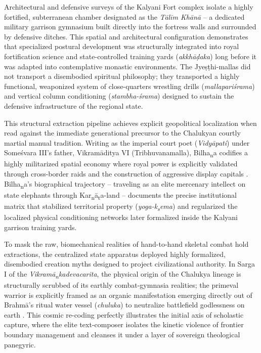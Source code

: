 \documentclass[11pt,twoside,letterpaper]{article}
\begin{document}
Architectural and defensive surveys of the Kalyani Fort complex isolate a highly fortified, subterranean chamber designated as the \textit{Tālīm Khānā} -- a dedicated military garrison gymnasium built directly into the fortress walls and surrounded by defensive ditches. This spatial and architectural configuration demonstrates that specialized postural development was structurally integrated into royal fortification science and state-controlled training yards (\textit{akkhāḍaka}) long before it was adapted into contemplative monastic environments. The Jyeṣṭhi-mallas did not transport a disembodied spiritual philosophy; they transported a highly functional, weaponized system of close-quarters wrestling drills (\textit{mallapariśrama}) and vertical column conditioning (\textit{stambha-śrama}) designed to sustain the defensive infrastructure of the regional state.

This structural extraction pipeline achieves explicit geopolitical localization when read against the immediate generational precursor to the Chalukyan courtly martial manual tradition. Writing as the imperial court poet (\textit{Vidy\={a}pati}) under Some\'svara III's father, Vikram\={a}ditya VI (Tribhuvanamalla), Bilha\textsubscript{n}a codifies a highly militarized spatial economy where royal power is explicitly validated through cross-border raids and the construction of aggressive display capitals \cite{Buhler1875}. Bilha\textsubscript{n}a's biographical trajectory -- traveling as an elite mercenary intellect on state elephants through Kar\textsubscript{n}\={a}\textsubscript{t}a-land -- documents the precise institutional matrix that stabilized territorial property (\textit{yoga-k\textsubscript{s}ema}) and regularized the localized physical conditioning networks later formalized inside the Kalyani garrison training yards.

To mask the raw, biomechanical realities of hand-to-hand skeletal combat hold extractions, the centralized state apparatus deployed highly formalized, disembodied creation myths designed to project civilizational authority. In Sarga I of the \textit{Vikram\={a}\textsubscript{n}kadevacarita}, the physical origin of the Chalukya lineage is structurally scrubbed of its earthly combat-gymnasia realities; the primeval warrior is explicitly framed as an organic manifestation emerging directly out of Brahm\={a}'s ritual water vessel (\textit{chuluka}) to neutralize battlefield godlessness on earth \cite{Buhler1875}. This cosmic re-coding perfectly illustrates the initial axis of scholastic capture, where the elite text-composer isolates the kinetic violence of frontier boundary management and cleanses it under a layer of sovereign theological panegyric.
\end{document}
